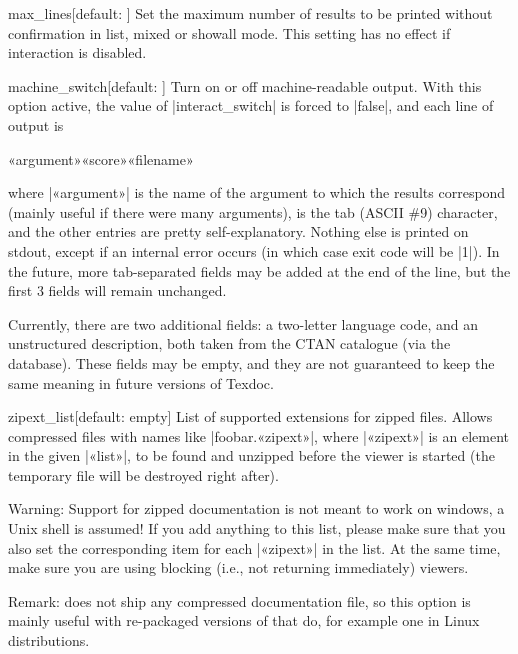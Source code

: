 \documentclass{texdoc-doc}
\begin{document}
\begin{confitem}{max\_lines}{}[default: ]
Set the maximum number of results to be printed without confirmation in list,
mixed or showall mode. This setting has no effect if interaction is disabled.
\end{confitem}

\begin{confitem}{machine\_switch}{}[default: ]
Turn on or off machine-readable output. With this option active, the value of
|interact_switch| is forced to |false|, and each line of output is
%
\begin{htcode}
«argument»\metatab«score»\metatab«filename»
\end{htcode}
%
where |«argument»| is the name of the argument to which the results correspond
(mainly useful if there were many arguments), {\metatab} is the tab (ASCII \#9)
character, and the other entries are pretty self-explanatory. Nothing else is
printed on stdout, except if an internal error occurs (in which case exit code
will be |1|). In the future, more tab-separated fields may be added at the end
of the line, but the first 3 fields will remain unchanged.

Currently, there are two additional fields: a two-letter language code, and an
unstructured description, both taken from the CTAN catalogue (via the {\TL}
database). These fields may be empty, and they are not guaranteed to keep the
same meaning in future versions of Texdoc.
\end{confitem}

\begin{confitem}{zipext\_list}{}[default: empty]
List of supported extensions for zipped files. Allows compressed files with
names like |foobar.«zipext»|, where |«zipext»| is an element in the given
|«list»|, to be found and unzipped before the viewer is started (the temporary
file will be destroyed right after).

Warning: Support for zipped documentation is not meant to work on windows, a
Unix shell is assumed! If you add anything to this list, please make sure that
you also set the corresponding  item for each
|«zipext»| in the list. At the same time, make sure you are using blocking
(i.e., not returning immediately) viewers.

Remark: {\TL} does not ship any compressed documentation file, so this option
is mainly useful with re-packaged versions of {\TL} that do, for example one in
Linux distributions.
\end{confitem}
\end{document}
